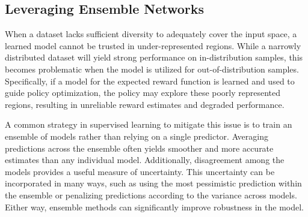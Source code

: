 \documentclass[./dissertation.tex]{subfiles}
\begin{document}
\subsection{Leveraging Ensemble Networks}
\label{sec:ensemble_reward}
When a dataset lacks sufficient diversity to adequately cover the input space, a learned model cannot be trusted in under-represented regions. While a narrowly distributed dataset will yield strong performance on in-distribution samples, this becomes problematic when the model is utilized for out-of-distribution samples. Specifically, if a model for the expected reward function is learned and used to guide policy optimization, the policy may explore these poorly represented regions, resulting in unreliable reward estimates and degraded performance.

A common strategy in supervised learning to mitigate this issue is to train an ensemble of models rather than relying on a single predictor. Averaging predictions across the ensemble often yields smoother and more accurate estimates than any individual model. Additionally, disagreement among the models provides a useful measure of uncertainty. This uncertainty can be incorporated in many ways, such as using the most pessimistic prediction within the ensemble or penalizing predictions according to the variance across models. Either way, ensemble methods can significantly improve robustness in the model. 
\end{document}
